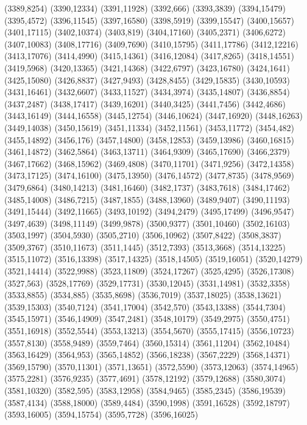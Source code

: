 (3389,8254)
(3390,12334)
(3391,11928)
(3392,666)
(3393,3839)
(3394,15479)
(3395,4572)
(3396,11545)
(3397,16580)
(3398,5919)
(3399,15547)
(3400,15657)
(3401,17115)
(3402,10374)
(3403,819)
(3404,17160)
(3405,2371)
(3406,6272)
(3407,10083)
(3408,17716)
(3409,7690)
(3410,15795)
(3411,17786)
(3412,12216)
(3413,17076)
(3414,4990)
(3415,14361)
(3416,12084)
(3417,8265)
(3418,14551)
(3419,5968)
(3420,13365)
(3421,14368)
(3422,6797)
(3423,16780)
(3424,1641)
(3425,15080)
(3426,8837)
(3427,9493)
(3428,8455)
(3429,15835)
(3430,10593)
(3431,16461)
(3432,6607)
(3433,11527)
(3434,3974)
(3435,14807)
(3436,8854)
(3437,2487)
(3438,17417)
(3439,16201)
(3440,3425)
(3441,7456)
(3442,4686)
(3443,16149)
(3444,16558)
(3445,12754)
(3446,10624)
(3447,16920)
(3448,16263)
(3449,14038)
(3450,15619)
(3451,11334)
(3452,11561)
(3453,11772)
(3454,482)
(3455,14892)
(3456,176)
(3457,14800)
(3458,12853)
(3459,13986)
(3460,16815)
(3461,14872)
(3462,5864)
(3463,13711)
(3464,9309)
(3465,17690)
(3466,2379)
(3467,17662)
(3468,15962)
(3469,4808)
(3470,11701)
(3471,9256)
(3472,14358)
(3473,17125)
(3474,16100)
(3475,13950)
(3476,14572)
(3477,8735)
(3478,9569)
(3479,6864)
(3480,14213)
(3481,16460)
(3482,1737)
(3483,7618)
(3484,17462)
(3485,14008)
(3486,7215)
(3487,1855)
(3488,13960)
(3489,9407)
(3490,11193)
(3491,15444)
(3492,11665)
(3493,10192)
(3494,2479)
(3495,17499)
(3496,9547)
(3497,4639)
(3498,11149)
(3499,9878)
(3500,9377)
(3501,10460)
(3502,16103)
(3503,1997)
(3504,5930)
(3505,2710)
(3506,10962)
(3507,8422)
(3508,3837)
(3509,3767)
(3510,11673)
(3511,1445)
(3512,7393)
(3513,3668)
(3514,13225)
(3515,11072)
(3516,13398)
(3517,14325)
(3518,14505)
(3519,16051)
(3520,14279)
(3521,14414)
(3522,9988)
(3523,11809)
(3524,17267)
(3525,4295)
(3526,17308)
(3527,563)
(3528,17769)
(3529,17731)
(3530,12045)
(3531,14981)
(3532,3358)
(3533,8855)
(3534,885)
(3535,8698)
(3536,7019)
(3537,18025)
(3538,13621)
(3539,15303)
(3540,7124)
(3541,17004)
(3542,570)
(3543,13388)
(3544,7304)
(3545,15971)
(3546,14909)
(3547,2481)
(3548,10179)
(3549,2975)
(3550,4751)
(3551,16918)
(3552,5544)
(3553,13213)
(3554,5670)
(3555,17415)
(3556,10723)
(3557,8130)
(3558,9489)
(3559,7464)
(3560,15314)
(3561,11204)
(3562,10484)
(3563,16429)
(3564,953)
(3565,14852)
(3566,18238)
(3567,2229)
(3568,14371)
(3569,15790)
(3570,11301)
(3571,13651)
(3572,5590)
(3573,12063)
(3574,14965)
(3575,2281)
(3576,9235)
(3577,4691)
(3578,12192)
(3579,12688)
(3580,3074)
(3581,10320)
(3582,595)
(3583,12958)
(3584,9465)
(3585,2345)
(3586,19539)
(3587,4134)
(3588,18000)
(3589,4484)
(3590,1998)
(3591,16528)
(3592,18797)
(3593,16005)
(3594,15754)
(3595,7728)
(3596,16025)
